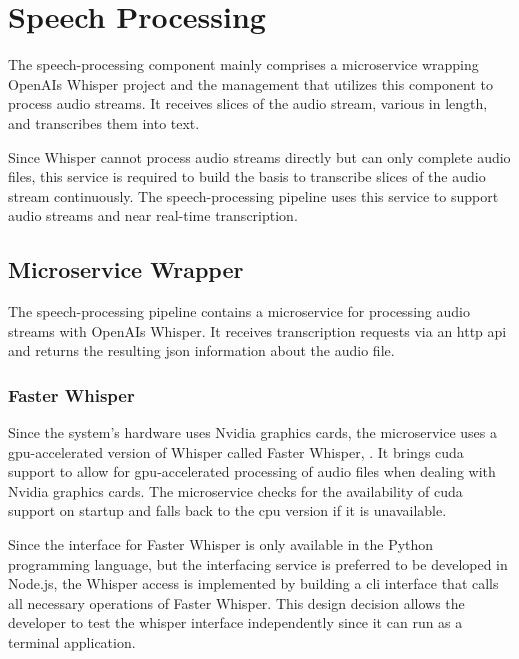 \chapter{Speech Processing}

\label{SpeechProcessing}

The speech-processing component mainly comprises a microservice wrapping OpenAIs Whisper project and the management 
that utilizes this component to process audio streams. It receives slices of the audio stream, various in length, and
transcribes them into text.

Since Whisper cannot process audio streams directly but can only complete audio files, this service is required to 
build the basis to transcribe slices of the audio stream continuously. The speech-processing pipeline uses this service 
to support audio streams and near real-time transcription.


\section{Microservice Wrapper}

The speech-processing pipeline contains a microservice for processing audio streams with OpenAIs Whisper. It receives 
transcription requests via an \ac{http} \ac{api} and returns the resulting \ac{json} information about the audio file.

\subsection{Faster Whisper}

Since the system's hardware uses Nvidia graphics cards, the microservice uses a \ac{gpu}-accelerated version of Whisper 
called Faster Whisper, \cite{fasterwhisper2023github}. It brings \ac{cuda} support to allow for \ac{gpu}-accelerated 
processing of audio files when dealing with Nvidia graphics cards. The microservice checks for the availability of 
\ac{cuda} support on startup and falls back to the \ac{cpu} version if it is unavailable.

Since the interface for Faster Whisper is only available in the Python programming language, but the interfacing 
service is preferred to be developed in Node.js, the Whisper access is implemented by building a \ac{cli} interface 
that calls all necessary operations of Faster Whisper. This design decision allows the developer to test the whisper 
interface independently since it can run as a terminal application.


